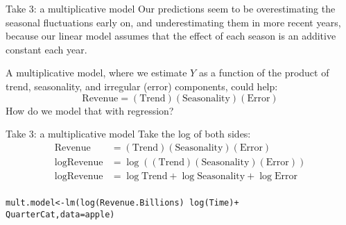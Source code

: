 \documentclass{beamer}\usepackage[]{graphicx}\usepackage[]{color}
\makeatletter
\newcommand{\hlopt}[1]{\textcolor[rgb]{1,0.894,0.769}{#1}}%
\newcommand{\hlstd}[1]{\textcolor[rgb]{1,0.894,0.769}{#1}}%
\newcommand{\hlkwb}[1]{\textcolor[rgb]{0.804,0.776,0.451}{#1}}%
\newcommand{\hlkwc}[1]{\textcolor[rgb]{0.78,0.941,0.545}{#1}}%
\newcommand{\hlkwd}[1]{\textcolor[rgb]{1,0.78,0.769}{#1}}%
\newenvironment{kframe}{%
 \def\at@end@of@kframe{}%
 \ifinner\ifhmode%
  \def\at@end@of@kframe{\end{minipage}}%
  \begin{minipage}{\columnwidth}%
 \fi\fi%
 \def\FrameCommand##1{\hskip\@totalleftmargin \hskip-\fboxsep
 \colorbox{shadecolor}{##1}\hskip-\fboxsep
     \hskip-\linewidth \hskip-\@totalleftmargin \hskip\columnwidth}%
 \MakeFramed {\advance\hsize-\width
   \@totalleftmargin\z@ \linewidth\hsize
   \@setminipage}}%
 {\par\unskip\endMakeFramed%
 \at@end@of@kframe}
\newenvironment{knitrout}{}{} %
\makeatother
\begin{document}
\begin{darkframes}
\begin{frame}[fragile]
\begin{knitrout}
\end{knitrout}
    \end{frame}

    \begin{frame}{Take 3: a multiplicative model}
      Our predictions seem to be \alert{overestimating} the seasonal fluctuations early on, and \alert{underestimating} them in more recent years, because our linear model assumes that the effect of each season is an additive constant each year.

      \bigskip\pause
      A \alert{multiplicative model}, where we estimate $Y$ as a function of the product of trend, seasonality, and irregular (error) components, could help:
      \[
        \text{Revenue} = (\text{Trend})(\text{Seasonality})(\text{Error})
      \]
      \pause
      How do we model that with regression?
    \end{frame}

    \begin{frame}{Take 3: a multiplicative model}
      \fontsm
      Take the log of both sides:
      \begin{equation*}
        \begin{split}
          \text{Revenue} &= (\text{Trend})(\text{Seasonality})(\text{Error}) \\
          \log\text{Revenue} &= \log\left( (\text{Trend})(\text{Seasonality})(\text{Error}) \right) \\
          \log\text{Revenue} &= \log\text{Trend} + \log\text{Seasonality} + \log\text{Error} \\
        \end{split}
      \end{equation*}
    \end{frame}

    \begin{frame}[fragile]
      \fontsm
\begin{knitrout}
\begin{kframe}
\begin{alltt}
\hlstd{mult.model} \hlkwb{<-} \hlkwd{lm}\hlstd{(}\hlkwd{log}\hlstd{(Revenue.Billions)} \hlopt{~} \hlkwd{log}\hlstd{(Time)} \hlopt{+}
  \hlstd{QuarterCat,} \hlkwc{data}\hlstd{=apple)}
\end{alltt}
\end{kframe}
\end{knitrout}
      \pause
\begin{knitrout}



\end{knitrout}
\end{frame}
\end{darkframes}
\end{document}
